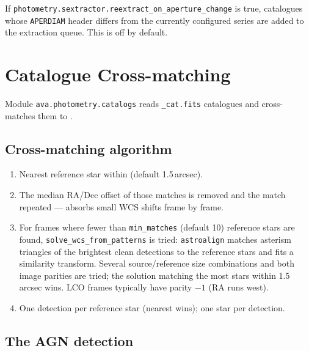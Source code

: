 \documentclass[12pt,a4paper]{article}
\begin{document}
If \texttt{photometry.sextractor.reextract\_\hspace{0pt}on\_\hspace{0pt}aperture\_\hspace{0pt}change} is true,
catalogues whose \texttt{APERDIAM} header differs from the currently
configured series are added to the extraction queue.  This is off by default.

\section{Catalogue Cross-matching}
\label{sec:catmatch}

Module \texttt{ava.photometry.catalogs} reads \texttt{\_cat.fits} catalogues
and cross-matches them to .

\subsection{Cross-matching algorithm}

\begin{enumerate}
  \item Nearest reference star within  (default
        1.5\,arcsec).
  \item The median RA/Dec offset of those matches is removed and the match
        repeated --- absorbs small WCS shifts frame by frame.
  \item For frames where fewer than \texttt{min\_matches} (default 10)
        reference stars are found, \texttt{solve\_\hspace{0pt}wcs\_\hspace{0pt}from\_\hspace{0pt}patterns} is
        tried: \texttt{astroalign} matches asterism triangles of the brightest
        clean detections to the reference stars and fits a similarity
        transform.  Several source/reference size combinations and both image
        parities are tried; the solution matching the most stars within 1.5\,arcsec
        wins.  LCO frames typically have parity $-1$ (RA runs west).
  \item One detection per reference star (nearest wins); one star per
        detection.
\end{enumerate}

\subsection{The AGN detection}
\end{document}
